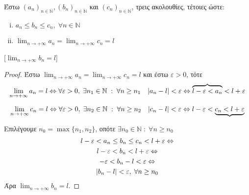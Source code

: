 \documentclass[a4paper,table]{report}
\begin{document}
\begin{mybox3}
  \begin{prop}
    Έστω $ (a_{n})_{n \in \mathbb{N}}, (b_{n})_{n \in \mathbb{N}} $ και 
    $ (c_{n})_{n \in \mathbb{N}} $, τρεις ακολουθίες, τέτοιες ώστε:
  \end{prop}

  \vspace{\baselineskip}

  \begin{minipage}{0.35\textwidth}
    \begin{enumerate}[i)]
      \item $ a_{n} \leq b_{n} \leq c_{n}, \; \forall n \in 
        \mathbb{N} $ \hfill {} 
      \item $ \lim_{n \to +\infty} a_{n} = \lim_{n \to +\infty} 
        c_{n} = l $ \hfill {}
    \end{enumerate}
  \end{minipage}
  [$ \lim_{n \to +\infty} b_{n} = l$]
\end{mybox3}
\begin{proof}
\item {}
  Έστω $ \lim_{n \to +\infty} a_{n} = \lim_{n \to +\infty} c_{n} = l $ και 
  έστω $ \varepsilon >0 $, τότε
  \[ \lim_{n \to +\infty} a_{n} = l \Leftrightarrow \forall 
    \varepsilon >0, \; \exists n_{1} \in \mathbb{N} \; : \; \forall n 
    \geq n_{1} \quad \abs{a_{n} - l} < \varepsilon \Leftrightarrow 
  \overbrace{l - \varepsilon < a_{n}} < l + \varepsilon \] 

  \[ \lim_{n \to +\infty} c_{n} = l \Leftrightarrow \forall 
    \varepsilon >0, \; \exists n_{2} 
    \in \mathbb{N} \; : \; \forall n \geq n_{2} \quad \abs{c_{n} - l} 
    < \varepsilon \Leftrightarrow 
  l - \varepsilon < \underbrace{c_{n} < l + \varepsilon} \]

  Επιλέγουμε $ n_{0} = \max \{ n_{1}, n_{2} \} $, οπότε 
  $ \exists n_{0} \in \mathbb{N} \; : \; 
  \forall n \geq n_{0} $
  \begin{gather*}
    l - \varepsilon < a_{n} \leq b_{n} \leq c_{n} < l + 
    \varepsilon \Leftrightarrow \\
    l - \varepsilon < b_{n} < l + \varepsilon \Leftrightarrow \\
    - \varepsilon < b_{n} - l < \varepsilon \Leftrightarrow \\
    \abs{b_{n}-l} < \varepsilon, \; \forall n \geq n_{0}
  \end{gather*}
  Άρα $ \lim_{n \to +\infty} b_{n} = l $.
\end{proof}
\end{document}
